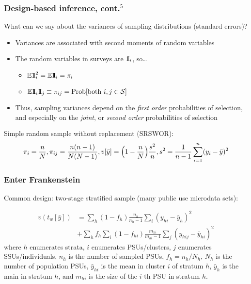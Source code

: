 \documentclass{beamer}
\newcommand{\Expect}{\mathbb{E}}
\newcommand{\One}{{\rm 1\kern-0.3em I}}
\begin{document}
\begin{frame}\frametitle{Design-based inference, cont.$^5$}

What can we say about the variances of sampling distributions (standard errors)?

\begin{itemize}
    \item Variances are associated with second moments of random variables
    \item The random variables in surveys are $\One_i$, so\ldots
        \begin{itemize}
            \item $\Expect \One_i^2 = \Expect \One_i = \pi_i$
            \item $\Expect \One_i \One_j \equiv \pi_{ij} = {\rm Prob}[\mbox{both }i,j \in \mathcal{S}]$
        \end{itemize}
    \item Thus, sampling variances depend on the \textit{first order}
        probabilities of selection, and especially on the
        \textit{joint}, or \textit{second order} probabilities of selection
\end{itemize}

Simple random sample without replacement (SRSWOR):
$$
\pi_i = \frac{n}{N}, \pi_{ij} = \frac{n(n-1)}{N(N-1)}, v[\bar y] = \Bigl(1-\frac nN\Bigr)\frac{s^2}n,
s^2 = \frac1{n-1} \sum_{i=1}^n (y_i - \bar y)^2
$$


\end{frame}

\begin{frame}\frametitle{Enter Frankenstein}

Common design: two-stage stratified sample (many public use microdata sets):

\begin{align*}
v(t_w[{\bar y}]) & =
\sum_{h} (1-f_h) \frac{n_h}{n_h-1}
\sum_{i} (y_{hi} - \bar y_h)^2
\\ &
+
\sum_{h} f_h
\sum_{i} (1-f_{hi})\frac{m_{hi}}{m_{hi}-1}
\sum_{j} (y_{hij} - \bar y_{hi})^2
\end{align*}
where $h$ enumerates strata, $i$ enumerates PSUs/clusters, $j$ enumerates SSUs/individuals, $n_h$ is the number of sampled PSUs,
$f_h=n_h/N_h$, $N_h$ is the number of population PSUs, $\bar y_{hi}$ is the mean in cluster $i$ of stratum $h$,
$\bar y_h$ is the main in stratum $h$, and $m_{hi}$ is the size of the $i$-th PSU in stratum $h$.

\end{frame}
\end{document}
